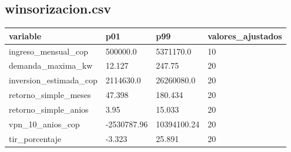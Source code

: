 \subsection*{winsorizacion.csv}
{\footnotesize\begin{longtable}{@{}llll@{}}
\toprule
variable & p01 & p99 & valores\_ajustados \\
\midrule\endhead
ingreso\_mensual\_cop & 500000.0 & 5371170.0 & 10 \\
demanda\_maxima\_kw & 12.127 & 247.75 & 20 \\
inversion\_estimada\_cop & 2114630.0 & 26260080.0 & 20 \\
retorno\_simple\_meses & 47.398 & 180.434 & 20 \\
retorno\_simple\_anios & 3.95 & 15.033 & 20 \\
vpn\_10\_anios\_cop & -2530787.96 & 10394100.24 & 20 \\
tir\_porcentaje & -3.323 & 25.891 & 20 \\
\bottomrule
\end{longtable}}
